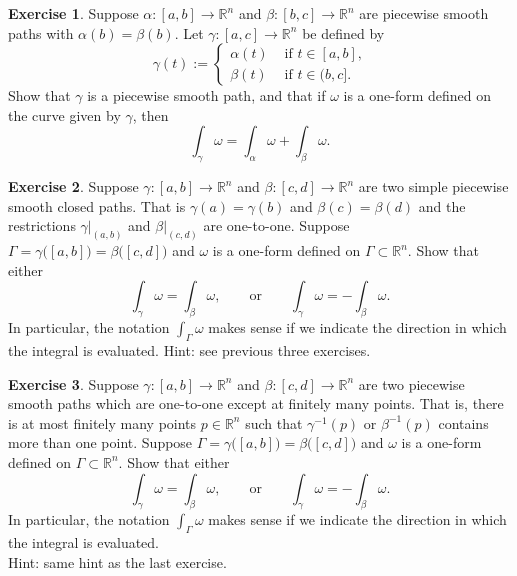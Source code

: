 \documentclass[12pt]{book}
\newcommand{\R}{{\mathbb{R}}}
\theoremstyle{plain}
\theoremstyle{remark}
\theoremstyle{definition}
\theoremstyle{exercise}
\newtheorem{exercise}{Exercise}[section]
\theoremstyle{example}
\begin{document}
\begin{exercise} 
Suppose $\alpha \colon [a,b] \to \R^n$ and
$\beta \colon [b,c] \to \R^n$ are piecewise smooth paths with
$\alpha(b)=\beta(b)$.  Let $\gamma \colon [a,c] \to \R^n$ be defined by
\begin{equation*}
\gamma(t) :=
\begin{cases}
\alpha(t) & \text{ if $t \in [a,b]$,} \\
\beta(t) & \text{ if $t \in (b,c]$.}
\end{cases}
\end{equation*}
Show that $\gamma$ is a piecewise smooth path, and that if $\omega$ is a
one-form defined on the curve given by $\gamma$, then
\begin{equation*}
\int_{\gamma} \omega =
\int_{\alpha} \omega +
\int_{\beta} \omega .
\end{equation*}
\end{exercise}

\begin{exercise} \label{mv:exercise:closedcurveintegral}
Suppose $\gamma \colon [a,b] \to \R^n$ and
$\beta \colon [c,d] \to \R^n$ are two simple piecewise smooth closed paths.
That is $\gamma(a)=\gamma(b)$ and $\beta(c) = \beta(d)$ and
the restrictions $\gamma|_{(a,b)}$ and $\beta|_{(c,d)}$ are one-to-one.
Suppose $\Gamma = \gamma\bigl([a,b]\bigr) = \beta\bigl([c,d]\bigr)$ and
$\omega$ is a one-form defined on $\Gamma \subset \R^n$.  Show that either
\begin{equation*}
\int_\gamma \omega = 
\int_\beta \omega,
\qquad \text{or} \qquad 
\int_\gamma \omega = 
- \int_\beta \omega.
\end{equation*}
In particular, the notation $\int_{\Gamma} \omega$ makes sense if we indicate
the direction in which the integral is evaluated.
Hint: see previous three exercises.
\end{exercise}

\begin{exercise} \label{mv:exercise:curveintegral}
Suppose $\gamma \colon [a,b] \to \R^n$ and
$\beta \colon [c,d] \to \R^n$ are two piecewise smooth paths
which are one-to-one except at finitely many points.  That is, there is at
most finitely many points $p \in \R^n$ such that
$\gamma^{-1}(p)$ or $\beta^{-1}(p)$ contains more than one point.
Suppose $\Gamma = \gamma\bigl([a,b]\bigr) = \beta\bigl([c,d]\bigr)$ and $\omega$ is a
one-form defined on $\Gamma \subset \R^n$.  Show that either
\begin{equation*}
\int_\gamma \omega = 
\int_\beta \omega,
\qquad \text{or} \qquad 
\int_\gamma \omega = 
- \int_\beta \omega.
\end{equation*}
In particular, the notation $\int_{\Gamma} \omega$ makes sense if we indicate
the direction in which the integral is evaluated.
\\
Hint: same hint as the last exercise.
\end{exercise}
\end{document}

